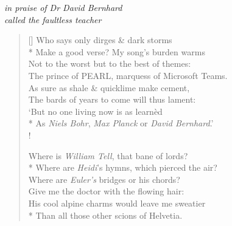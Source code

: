 \begin{center}
\textit{in praise of Dr David Bernhard}\\
\textit{called the faultless teacher}
\end{center}

\bigskip

\settowidth{\versewidth}{His cool alpine charms would leave me sweatier}
\begin{verse}[\versewidth]
Who says only dirges \& dark storms\\*
Make a good verse? My song's burden warms\\
Not to the worst but to the best of themes:\\
The prince of PEARL, marquess of Microsoft Teams.\\
As sure as shale \& quicklime make cement,\\
The bards of years to come will thus lament:\\
`But no one living now is  as learn\`ed\\*
As \textit{Niels Bohr}, \textit{Max Planck} or \textit{David Bernhard}.'\\!

Where is \textit{William Tell}, that bane of lords?\\*
\vin Where are \textit{Heidi}'s hymns, which pierced the air?\\
Where are \textit{Euler's} bridges or his chords?\\
\vin Give me the doctor with the flowing hair:\\
His cool alpine charms would leave me sweatier\\*
Than all those other scions of Helvetia.
\end{verse}
